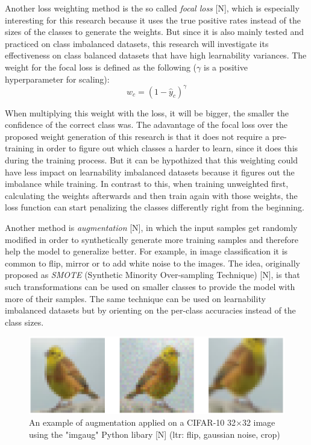 \documentclass[journal]{IEEEtran}
\begin{document}
Another loss weighting method is the so called \emph{focal loss} [N], which is especially interesting for this research because it uses the true positive rates instead of the sizes of the classes to generate the weights.
But since it is also mainly tested and practiced on class imbalanced datasets, this research will investigate its effectiveness on class balanced datasets that have high learnability variances.
The weight for the focal loss is defined as the following ($\gamma$ is a positive hyperparameter for scaling):
\[ w_c = (1 - \hat{y}_c)^\gamma \]

When multiplying this weight with the loss, it will be bigger, the smaller the confidence of the correct class was. 
The adavantage of the focal loss over the proposed weight generation of this research is that it does not require a pre-training in order to figure out which classes a harder to learn, since it does this during the training process.
But it can be hypothized that this weighting could have less impact on learnability imbalanced datasets because it figures out the imbalance while training.
In contrast to this, when training unweighted first, calculating the weights afterwards and then train again with those weights, the loss function can start penalizing the classes differently right from the beginning.


Another method is \emph{augmentation} [N], in which the input samples get randomly modified in order to synthetically generate more training samples and therefore help the model to generalize better. 
For example, in image classification it is common to flip, mirror or to add white noise to the images. 
The idea, originally proposed as \emph{SMOTE} (Synthetic Minority Over-sampling Technique) [N], is that such transformations can be used on smaller classes to provide the model with more of their samples.
The same technique can be used on learnability imbalanced datasets but by orienting on the per-class accuracies instead of the class sizes.

\begin{figure}[h!]
        \includegraphics[width=\linewidth]{images/augmentation3.png}
        \caption{An example of augmentation applied on a CIFAR-10 32$\times$32 image using the "imgaug" Python libary [N] (ltr: flip, gaussian noise, crop)}
        \label{fig:augmentation}
\end{figure}
\end{document}

